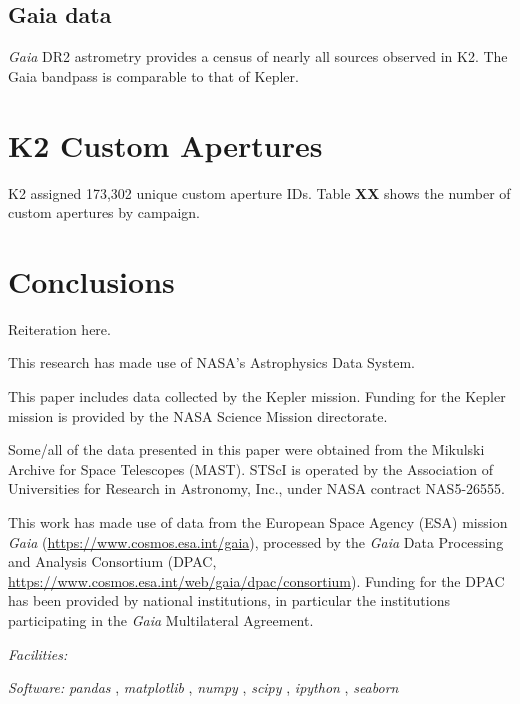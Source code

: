 \documentclass[twocolumn]{emulateapj}%
\newcommand{\project}[1]{\textsl{#1}}
\begin{document}
\subsection{Gaia data}
\emph{Gaia} DR2 astrometry \citep{2016A&A...595A...1G, 2018A&A...616A...1G} provides a census of nearly all sources observed in K2.  The Gaia bandpass is comparable to that of Kepler.

\section{K2 Custom Apertures}
K2 assigned 173,302 unique custom aperture IDs.  Table \textbf{XX} shows the number of custom apertures by campaign.



\section{Conclusions}

Reiteration here.

\clearpage
\pagebreak




\acknowledgements

This research has made use of NASA's Astrophysics Data System.

This paper includes data collected by the Kepler mission. Funding for the Kepler mission is provided by the NASA Science Mission directorate.

Some/all of the data presented in this paper were obtained from the Mikulski Archive for Space Telescopes (MAST). STScI is operated by the Association of Universities for Research in Astronomy, Inc., under NASA contract NAS5-26555.

This work has made use of data from the European Space Agency (ESA) mission
{\it Gaia} (\url{https://www.cosmos.esa.int/gaia}), processed by the {\it Gaia}
Data Processing and Analysis Consortium (DPAC,
\url{https://www.cosmos.esa.int/web/gaia/dpac/consortium}). Funding for the DPAC
has been provided by national institutions, in particular the institutions
participating in the {\it Gaia} Multilateral Agreement.


{\it Facilities:} 

{\it Software: }
 \project{pandas} \citep{mckinney10},
 \project{matplotlib} \citep{hunter07},
 \project{numpy} \citep{vanderwalt11},
 \project{scipy} \citep{jones01},
 \project{ipython} \citep{perez07},
 \project{seaborn} \citep{waskom14}

\clearpage



\end{document}
